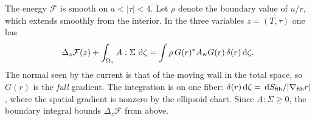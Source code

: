 \begin{proposition}\label{prop:energy-flux}
The energy $\mathcal F$ is smooth on $a<|\tau|<4$. Let $\rho$ denote
the boundary value of $u/r$, which extends smoothly from the interior.
In the three variables $z=(T,\tau)$ one has
\begin{equation}\label{eq:energy-flux}
 \Delta_z\mathcal F(z)+\int_{\Omega_z} A:\Sigma\,\,\mathrm d\zeta
   =\int \rho\,G(r)^*A_{\rm w}G(r)\,\delta(r)\,\mathrm d\zeta .
\end{equation}
The normal seen by the current is that of the moving wall in the
total space, so $G(r)$ is the \emph{full} gradient. The integration is
on one fiber: $\delta(r)\,\mathrm d\zeta=\,\mathrm d S_{\rm fib}/|\nabla_{\rm fib}r|$,
where the spatial gradient is nonzero by the ellipsoid chart. Since
$A:\Sigma\ge0$, the boundary integral bounds $\Delta_z\mathcal F$
from above.
\end{proposition}

